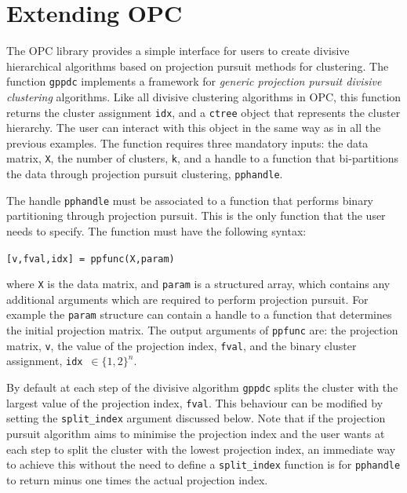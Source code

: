 \documentclass{book}
\begin{document}

\chapter{Extending OPC}\label{sec:extend}


The OPC library provides a simple interface for users to create divisive
hierarchical algorithms based on projection pursuit methods for clustering. 
%
The function {\tt gppdc} implements a framework for {\em generic projection
pursuit divisive clustering} algorithms.
%
Like all divisive clustering algorithms in OPC, this function returns the cluster
assignment {\tt idx}, and a {\tt ctree} object that represents the cluster
hierarchy. The user can interact with this object in the same way as in all the
previous examples.
%
The function requires three mandatory inputs: the data matrix, {\tt X}, the
number of clusters, {\tt k}, and a handle to a function that bi-partitions the
data through projection pursuit clustering, {\tt pphandle}.
%

The handle {\tt pphandle} must be associated to a function that performs
binary partitioning through projection pursuit. This is the only function that
the user needs to specify. The function must have the following syntax:

\begin{center}
{\tt [v,fval,idx] = ppfunc(X,param)}
\end{center}
%
where {\tt X} is the data matrix, and {\tt param} is a structured array, which
%
contains any additional arguments which are required to perform projection pursuit.
%
For example the {\tt param} structure can contain a handle to a function that
determines the initial projection matrix.
%
The output arguments of {\tt ppfunc}
are: the projection matrix, {\tt v}, the value of the projection index,
{\tt fval}, and the binary cluster assignment, {\tt idx}~$\in \{1,2\}^n$.

By default at each step of the divisive algorithm {\tt gppdc} splits the cluster
with the largest value of the projection index, {\tt fval}. This behaviour can
be modified by setting the {\tt split\_index} argument discussed below.
Note that if the projection
pursuit algorithm aims to minimise the projection index and the user wants at each
step to split the cluster with the lowest projection index, an immediate
way to achieve this without the need to define a {\tt split\_index} function 
is for {\tt pphandle} to return minus one times the actual projection index.
\end{document}
